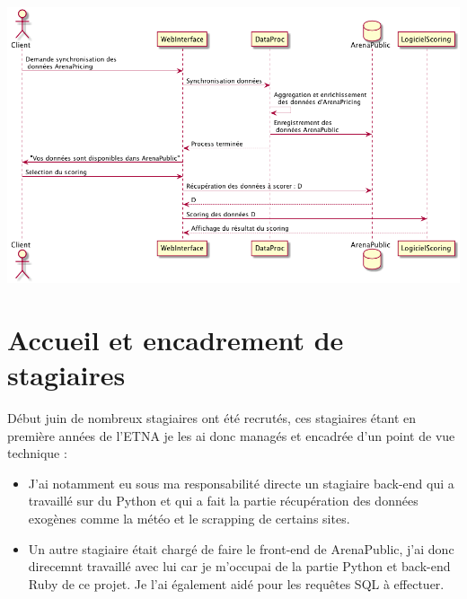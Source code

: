 \begin{center}
\includegraphics[scale=0.52]{images/scoring.png}
\label{scoring}
\end{center}


\section{Accueil et encadrement de stagiaires}
Début juin de nombreux stagiaires ont été recrutés, ces stagiaires étant en première années de l'ETNA je les ai donc managés et encadrée d'un point de vue technique :
\begin{itemize}
	\item[\textbullet] J'ai notamment eu sous ma responsabilité directe un stagiaire back-end qui a travaillé sur du Python et qui a fait la partie récupération des données exogènes comme la météo et le scrapping de certains sites. 
	\item[\textbullet] Un autre stagiaire était chargé de faire le front-end de ArenaPublic, j'ai donc direcemnt travaillé avec lui car je m'occupai de la partie Python et back-end Ruby de ce projet. Je l'ai également aidé pour les requêtes SQL à effectuer.
\end{itemize}

  


